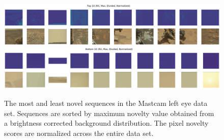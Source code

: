 \begin{figure}
\centering
\includegraphics[width=\linewidth]{figs/msl/top10.jpg}
\includegraphics[width=\linewidth]{figs/msl/bottom10.jpg}
\caption[Examples of the Most and Least Novel Images in the Mastcam Left Eye Data Set]{The most and least novel sequences in the Mastcam left eye data set. Sequences are sorted by maximum novelty value obtained from a brightness corrected background distribution. The pixel novelty scores are normalized across the entire data set.}
\label{msl/fig:sorted}
\end{figure}

